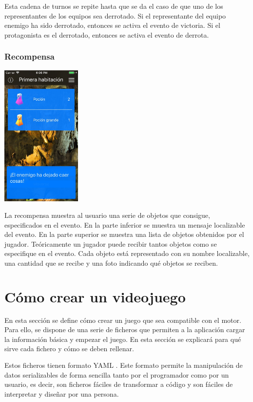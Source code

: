 Esta cadena de turnos se repite hasta que se da el caso de que uno de los representantes de los equipos sea derrotado. Si el representante del equipo enemigo ha sido derrotado, entonces se activa el evento de victoria. Si el protagonista es el derrotado, entonces se activa el evento de derrota.

\subsubsection{Recompensa}
\begin{center}
	\includegraphics[width=0.3\textwidth]{include/snapshots/reward.jpg}
\end{center}
La recompensa muestra al usuario una serie de objetos que consigue, especificados en el evento.
En la parte inferior se muestra un mensaje localizable del evento. En la parte superior se muestra una lista de objetos obtenidos por el jugador. Teóricamente un jugador puede recibir tantos objetos como se especifique en el evento.
Cada objeto está representado con su nombre localizable, una cantidad que se recibe y una foto indicando qué objetos se reciben.

\section{Cómo crear un videojuego} \label{developmentGuide}
En esta sección se define cómo crear un juego que sea compatible con el motor. Para ello, se dispone de una serie de ficheros que permiten a la aplicación cargar la información básica y empezar el juego. En esta sección se explicará para qué sirve cada fichero y cómo se deben rellenar.

Estos ficheros tienen formato YAML \cite{yamlDocumentation}. Este formato permite la manipulación de datos serializables de forma sencilla tanto por el programador como por un usuario, es decir, son ficheros fáciles de transformar a código y son fáciles de interpretar y diseñar por una persona.

